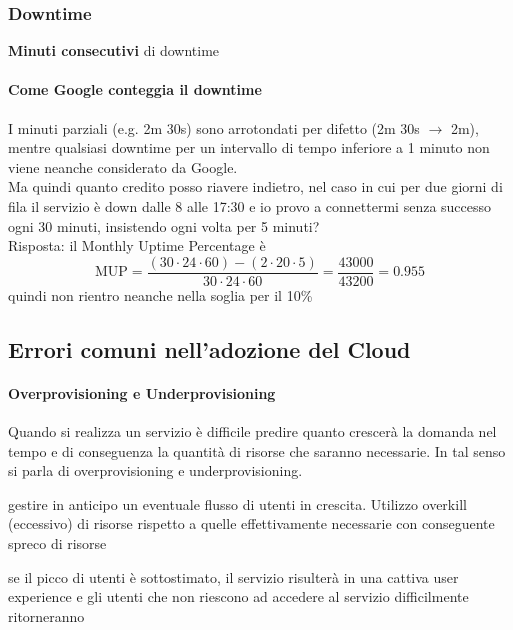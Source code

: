 \newpage
\subsubsection{Downtime}
\begin{definition}
    \textbf{Minuti consecutivi} di downtime
\end{definition}
\paragraph{Come Google conteggia il downtime} I minuti parziali (e.g. 2m 30s) sono arrotondati per difetto (2m 30s $\rightarrow$ 2m), mentre qualsiasi downtime per un intervallo di tempo inferiore a 1 minuto non viene neanche considerato da Google.\\
Ma quindi quanto credito posso riavere indietro, nel caso in cui per due giorni di fila il servizio è down dalle 8 alle 17:30 e io provo a connettermi senza successo ogni 30 minuti, insistendo ogni volta per 5 minuti?\\
Risposta: il Monthly Uptime Percentage è $$ \text{MUP} = \frac{(30\cdot 24\cdot 60)-(2\cdot 20\cdot 5)}{30\cdot 24\cdot 60} = \frac{43000}{43200} = 0.955$$ quindi non rientro neanche nella soglia per il 10\%

\subsection{Errori comuni nell'adozione del Cloud}
\paragraph{Overprovisioning e Underprovisioning}
Quando si realizza un servizio è difficile predire quanto crescerà la domanda nel tempo e di conseguenza la quantità di risorse che saranno necessarie. In tal senso si parla di overprovisioning e underprovisioning.
\begin{definition}[Overprovisioning]
gestire in anticipo un eventuale flusso di utenti in crescita. Utilizzo overkill (eccessivo) di risorse rispetto a quelle effettivamente necessarie con conseguente spreco di risorse    
\end{definition}

\begin{definition}[Underprovisioning]
se il picco di utenti è sottostimato, il servizio risulterà in una cattiva user experience e gli utenti che non riescono ad accedere al servizio difficilmente ritorneranno
\end{definition}

